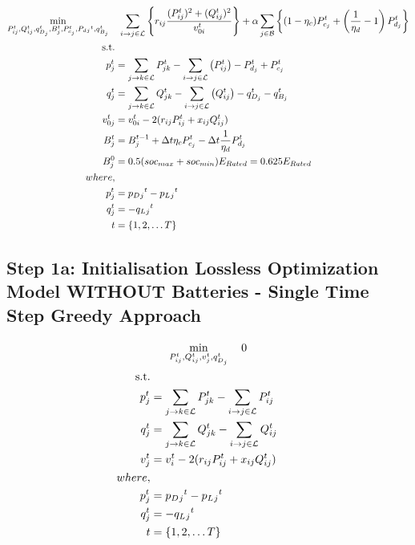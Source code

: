 \begin{gather}
    \min_{P_{ij}^t, Q_{ij}^t, q_{D_j}^t, B_{j}^{t},
	P_{c_j}^t, P_d{_j}^t, q_{B_j}^t} \quad
	\sum_{\fromto{i, j} \in \mathcal{L}} \left\{r_{ij}\frac{(P_{ij}^{t})^2 + (Q_{ij}^{t})^2}{v_{0i}^{t}} \right\} + 
	\alpha \sum_{j \in \mathcal{B}} \left\{(1- \eta_c)P_{c_j}^t + \left( \frac{1}{\eta_d}-1 \right) P_{d_j}^t \right\} \\
	\begin{align}
		\text{s.t.} & {}\nonumber \\
		{p_j^t} & = {\sum_{\fromto{j,k} \in \mathcal{L}} P_{jk}^t - \sum_{\fromto{i,j} \in \mathcal{L}}\left(P_{ij}^t\right) - P_{d_j}^t + P_{c_j}^t} && \\
		{q_j^t} & = {\sum_{\fromto{j,k} \in \mathcal{L}} Q_{jk}^t - \sum_{\fromto{i,j} \in \mathcal{L}}\left(Q_{ij}^t\right) - q_{D_j}^t - q_{B_j}^t} && \\
		{v_{0j}^t} & = {v_{0i}^t - 2(r_{ij}P_{ij}^t + x_{ij}Q_{ij}^t)} && \\
		{B_{j}^{t}} &= {B_{j}^{t-1} + \Delta t  \eta_c P_{c_j}^t - \Delta t\frac{1}{\eta_d} P_{d_j}^t} \\
		{ B_{j}^{0} } &= { 0.5(soc_{max}+soc_{min})E_{Rated} = 0.625E_{Rated}} \\
		{where,} & {} \\
		{p_j^t} &= {p_D{_j}^t - p_L{_j}^t} \\
		{q_j^t} &= {-q_L{_j}^t} \\
		{t} &= {\{1, 2, \ldots T\}}
	\end{align}
\end{gather}

\subsection*{Step 1a: Initialisation Lossless Optimization Model WITHOUT Batteries - Single Time Step Greedy Approach}


\begin{gather}
    \min_{P_{ij}^t, Q_{ij}^t, v_{j}^t,  q_{D_j}^t} \quad 0 \\
	\begin{align}
		\text{s.t.} & {}\nonumber \\
		{p_j^t} & = {\sum_{\fromto{j,k} \in \mathcal{L}} P_{jk}^t - \sum_{\fromto{i,j} \in \mathcal{L}} P_{ij}^t } && \\
		{q_j^t} & = {\sum_{\fromto{j,k} \in \mathcal{L}} Q_{jk}^t - \sum_{\fromto{i,j} \in \mathcal{L}} Q_{ij}^t } && \\
		{v_j^t} & = {v_{i}^t - 2(r_{ij}P_{ij}^t + x_{ij}Q_{ij}^t)} && \\
		{where,} & {} \\
		{p_j^t} &= {p_D{_j}^t - p_L{_j}^t} \\
		{q_j^t} &= {-q_L{_j}^t} \\
		{t} &= {\{1, 2, \ldots T\}}
	\end{align}
\end{gather}

